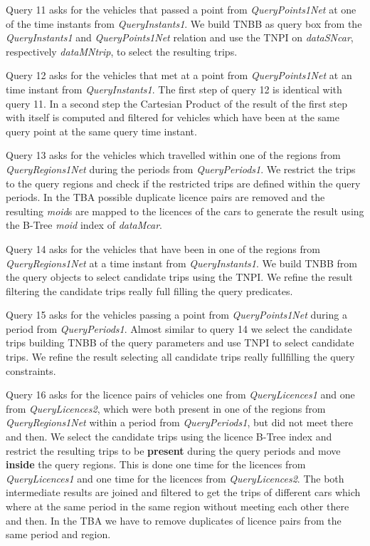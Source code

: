 \documentclass[a4paper]{article}
\newcommand{\op}[1]{\textbf{#1}}
\begin{document}
Query 11 asks for the vehicles that passed a point from \textit{QueryPoints1Net}
at one of the time instants from \textit{QueryInstants1}. We build TNBB as query 
box from the \textit{QueryInstants1} and \textit{QueryPoints1Net} relation and 
use the TNPI on \textit{dataSNcar}, respectively \textit{dataMNtrip}, to select 
the resulting trips.

Query 12 asks for the vehicles that met at a point from \textit{QueryPoints1Net} 
at an time instant from \textit{QueryInstants1}. The first step of query 12 is 
identical with query 11.
In a second step the Cartesian Product of the result of the first step with
itself is computed and filtered for vehicles which have been at the same query point
at the same query time instant.

Query 13 asks for the vehicles which travelled within one of the regions from
\textit{QueryRegions1Net} during the periods from \textit{QueryPeriods1}. We 
restrict the trips to the query regions and check if the restricted trips are 
defined within the query periods. In the TBA possible duplicate licence pairs 
are removed and the resulting \textit{moid}s are mapped to the licences of the 
cars to generate the result using the B-Tree \textit{moid} index of \textit{dataMcar}.

Query 14 asks for the vehicles that have been in one of the regions from
\textit{QueryRegions1Net} at a time instant from \textit{QueryInstants1}. We build
TNBB from the query objects to select candidate trips using the TNPI. We refine 
the result filtering the candidate trips really full filling the query predicates.

Query 15 asks for the vehicles passing a point from \textit{QueryPoints1Net} during a
period from \textit{QueryPeriods1}. Almost similar to query 14 we select the candidate
trips building TNBB of the query parameters and use TNPI to select candidate trips. 
We refine the result selecting all candidate trips really fullfilling
the query constraints.

Query 16 asks for the licence pairs of vehicles one from \textit{QueryLicences1} 
and one from \textit{QueryLicences2}, which were both present in one of the regions
from \textit{QueryRegions1Net} within a period from \textit{QueryPeriods1}, but 
did not meet there and then. We select the candidate trips using the licence 
B-Tree index and restrict the resulting trips to be \op{present} during the query 
periods and move \op{inside} the query regions. This is done one time for the licences 
from \textit{QueryLicences1} and one time for the licences from \textit{QueryLicences2}.
The both intermediate results are joined and filtered to get the
trips of different cars which where at the same period in the same region
without meeting each other there and then. In the TBA we have
to remove duplicates of licence pairs from the same period and region.
\end{document}
